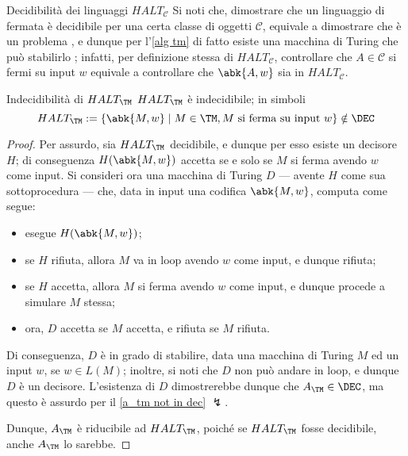 \documentclass[a4paper, 12pt]{report}
\begin{document}
    \begin{framedobs}{Decidibilità dei linguaggi $HALT_\mathcal C$}
        Si noti che, dimostrare che un linguaggio di fermata è decidibile per una certa classe di oggetti $\mathcal{C}$, equivale a dimostrare che  è un problema , e dunque per l'\cref{alg tm} di fatto esiste una macchina di Turing che può stabilirlo ; infatti, per definizione stessa di $HALT_\mathcal C$, controllare che $A \in \mathcal{C}$ si fermi su input $w$ equivale a controllare che $\abk{A,w}$ sia in $HALT_\mathcal{C}$.
    \end{framedobs}

    \begin{framedthm}{Indecidibilità di $HALT_\TM$}
        $HALT_\TM$ è indecidibile; in simboli $$HALT_\TM := \{\abk{M, w} \mid M \in \TM , M \ \textrm{si ferma su input} \ w\} \notin \DEC$$
    \end{framedthm}

    \begin{proof}
        Per assurdo, sia $HALT_\TM$ decidibile, e dunque per esso esiste un decisore $H$; di conseguenza $H(\abk{M, w})$ accetta se e solo se $M$ si ferma avendo $w$ come input. Si consideri ora una macchina di Turing $D$ --- avente $H$ come sua sottoprocedura --- che, data in input una codifica $\abk{M, w}$, computa come segue:

        \begin{itemize}
            \item esegue $H(\abk{M,w})$;
            \item se $H$ rifiuta, allora $M$ va in loop avendo $w$ come input, e dunque rifiuta;
            \item se $H$ accetta, allora $M$ si ferma avendo $w$ come input, e dunque procede a simulare $M$ stessa;
            \item ora, $D$ accetta se $M$ accetta, e rifiuta se $M$ rifiuta.
        \end{itemize}

        Di conseguenza, $D$ è in grado di stabilire, data una macchina di Turing $M$ ed un input $w$, se $w \in L(M)$; inoltre, si noti che $D$ non può andare in loop, e dunque $D$ è un decisore. L'esistenza di $D$ dimostrerebbe dunque che $A_\TM \in \DEC$, ma questo è assurdo per il \cref{a_tm not in dec} $\lightning$.

        Dunque, $A_\TM$ è riducibile ad $HALT_\TM$, poiché se $HALT_\TM$ fosse decidibile, anche $A_\TM$ lo sarebbe.
    \end{proof}
\end{document}
